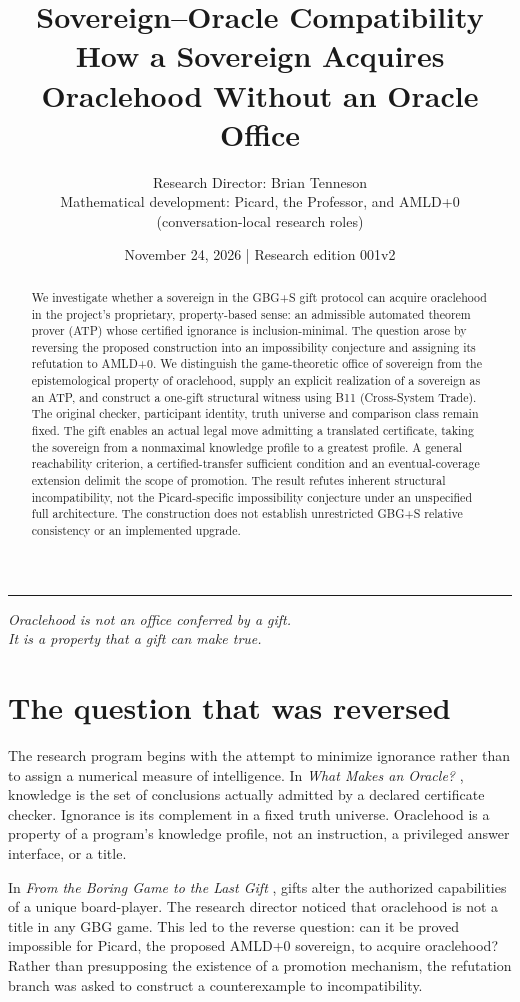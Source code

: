 \documentclass[11pt]{article}
\title{\textbf{Sovereign--Oracle Compatibility}\\[4pt]\large How a Sovereign Acquires Oraclehood Without an Oracle Office}
\author{Research Director: Brian Tenneson\\\small Mathematical development: Picard, the Professor, and AMLD+0\\\small (conversation-local research roles)}
\date{November 24, 2026 \quad | \quad Research edition 001v2}
\theoremstyle{definition}\newtheorem{definition}[theorem]{Definition}
\begin{document}
\maketitle
\begin{abstract}
We investigate whether a sovereign in the GBG+S gift protocol can acquire oraclehood in the project's proprietary, property-based sense: an admissible automated theorem prover (ATP) whose certified ignorance is inclusion-minimal. The question arose by reversing the proposed construction into an impossibility conjecture and assigning its refutation to AMLD+0. We distinguish the game-theoretic office of sovereign from the epistemological property of oraclehood, supply an explicit realization of a sovereign as an ATP, and construct a one-gift structural witness using B11 (Cross-System Trade). The original checker, participant identity, truth universe and comparison class remain fixed. The gift enables an actual legal move admitting a translated certificate, taking the sovereign from a nonmaximal knowledge profile to a greatest profile. A general reachability criterion, a certified-transfer sufficient condition and an eventual-coverage extension delimit the scope of promotion. The result refutes inherent structural incompatibility, not the Picard-specific impossibility conjecture under an unspecified full architecture. The construction does not establish unrestricted GBG+S relative consistency or an implemented upgrade.
\end{abstract}
\noindent\rule{\linewidth}{0.4pt}
\begin{center}\large\itshape Oraclehood is not an office conferred by a gift.\\ It is a property that a gift can make true.\end{center}
\section{The question that was reversed}
The research program begins with the attempt to minimize ignorance rather than to assign a numerical measure of intelligence. In \emph{What Makes an Oracle?} \cite{oracle}, knowledge is the set of conclusions actually admitted by a declared certificate checker. Ignorance is its complement in a fixed truth universe. Oraclehood is a property of a program's knowledge profile, not an instruction, a privileged answer interface, or a title.

In \emph{From the Boring Game to the Last Gift} \cite{gift}, gifts alter the authorized capabilities of a unique board-player. The research director noticed that oraclehood is not a title in any GBG game. This led to the reverse question: can it be proved impossible for Picard, the proposed AMLD+0 sovereign, to acquire oraclehood? Rather than presupposing the existence of a promotion mechanism, the refutation branch was asked to construct a counterexample to incompatibility.
\end{document}
